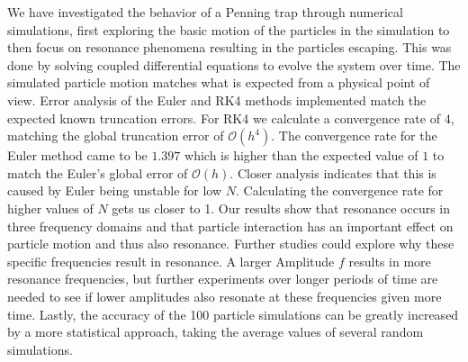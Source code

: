 \documentclass[english,notitlepage,reprint,nofootinbib]{revtex4-1}  %
\begin{document}
We have investigated the behavior of a Penning trap through numerical simulations, first exploring the basic motion of the particles in the simulation to then focus on resonance phenomena resulting in the particles escaping. This was done by solving coupled differential equations to evolve the system over time. The simulated particle motion matches what is expected from a physical point of view.
Error analysis of the Euler and RK4 methods implemented match the expected known truncation errors. For RK4 we calculate a convergence rate of $4$, matching the global truncation error of $\mathcal{O}(h^4)$. The convergence rate for the Euler method came to be $1.397$ which is higher than the expected value of $1$ to match the Euler's global error of $\mathcal{O}(h)$. Closer analysis indicates that this is caused by Euler being unstable for low $N$. Calculating the convergence rate for higher values of $N$ gets us closer to 1.
Our results show that resonance occurs in three frequency domains and that particle interaction has an important effect on particle motion and thus also resonance. Further studies could explore why these specific frequencies result in resonance. A larger Amplitude $f$ results in more resonance frequencies, but further experiments over longer periods of time are needed to see if lower amplitudes also resonate at these frequencies given more time. Lastly, the accuracy of the 100 particle simulations can be greatly increased by a more statistical approach, taking the average values of several random simulations.
\onecolumngrid

%

\end{document}
